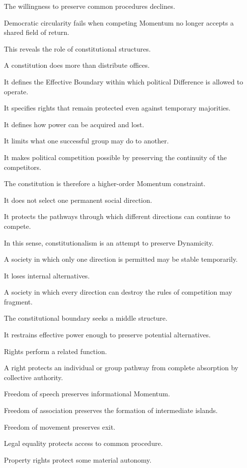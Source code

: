 The willingness to preserve common procedures declines.

Democratic circularity fails when competing Momentum no longer accepts a shared field of return.

This reveals the role of constitutional structures.

A constitution does more than distribute offices.

It defines the Effective Boundary within which political Difference is allowed to operate.

It specifies rights that remain protected even against temporary majorities.

It defines how power can be acquired and lost.

It limits what one successful group may do to another.

It makes political competition possible by preserving the continuity of the competitors.

The constitution is therefore a higher-order Momentum constraint.

It does not select one permanent social direction.

It protects the pathways through which different directions can continue to compete.

In this sense, constitutionalism is an attempt to preserve Dynamicity.

A society in which only one direction is permitted may be stable temporarily.

It loses internal alternatives.

A society in which every direction can destroy the rules of competition may fragment.

The constitutional boundary seeks a middle structure.

It restrains effective power enough to preserve potential alternatives.

Rights perform a related function.

A right protects an individual or group pathway from complete absorption by collective authority.

Freedom of speech preserves informational Momentum.

Freedom of association preserves the formation of intermediate islands.

Freedom of movement preserves exit.

Legal equality protects access to common procedure.

Property rights protect some material autonomy.


